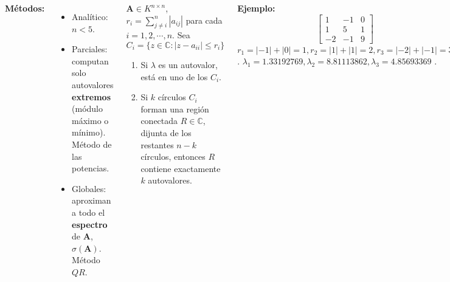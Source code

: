 \documentclass[9pt, aspectratio=169]{beamer}
\begin{document}
\begin{frame}
\begin{columns}[t]
\cx
\textbf{Métodos:}
\begin{itemize}
    \item Analítico: $n < 5$.
    \item Parciales: computan solo autovalores \textbf{extremos} (módulo máximo o mínimo). Método de las potencias.
    \item Globales: aproximan a todo el \textbf{espectro} de $\bm{A}$, $\sigma(\bm{A})$. Método $QR$.
\end{itemize}
\hrulefill \pause

\begin{theorem}
    $\bm{A} \in K^{n \times n}$, $r_i = \sum_{j \neq i}^n |a_{ij}|$ para cada $i = 1, 2, \cdots, n$. Sea
    \[ C_i = \{ z \in \mathbb{C} : |z - a_{ii}| \leq r_i \} \]
    \vspace{-2em}
    \begin{enumerate}
        \item Si $\lambda$ es un autovalor, está en uno de los $C_i$.
        \item Si $k$ círculos $C_i$ forman una región conectada $R \in \mathbb{C}$, dijunta de los restantes $n - k$ círculos, entonces $R$ contiene exactamente $k$ autovalores.
    \end{enumerate}
\end{theorem} \pause

\cx
\textbf{Ejemplo:}
\[ \begin{bmatrix}
    1 & - 1 & 0 \\
    1 & 5 & 1 \\
    -2 & -1 & 9
\end{bmatrix} \]
{\small $r_1 = |-1| + |0| = 1, r_2 = |1| + |1| = 2, r_3 = |-2| + |-1| = 3$.}
{\small $\lambda_1 = 1.33192769, \lambda_2 = 8.81113862, \lambda_3 = 4.85693369$ }.
\begin{center}
    \includegraphics[width=1.0\textwidth]{figs/circles.pdf}
\end{center}
\end{columns}
\end{frame}
\end{document}
